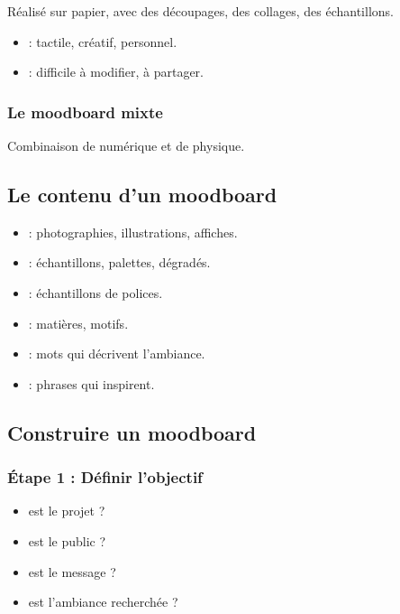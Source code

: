 Réalisé sur papier, avec des découpages, des collages, des échantillons.

\begin{itemize}
    \item {} : tactile, créatif, personnel.
    \item {} : difficile à modifier, à partager.
\end{itemize}

\subsubsection{Le moodboard mixte}

Combinaison de numérique et de physique.

\subsection{Le contenu d'un moodboard}

\begin{itemize}
    \item {} : photographies, illustrations, affiches.
    \item {} : échantillons, palettes, dégradés.
    \item {} : échantillons de polices.
    \item {} : matières, motifs.
    \item {} : mots qui décrivent l'ambiance.
    \item {} : phrases qui inspirent.
\end{itemize}

\subsection{Construire un moodboard}

\subsubsection{Étape 1 : Définir l'objectif}

\begin{itemize}
    \item {} est le projet ?
    \item {} est le public ?
    \item {} est le message ?
    \item {} est l'ambiance recherchée ?
\end{itemize}

